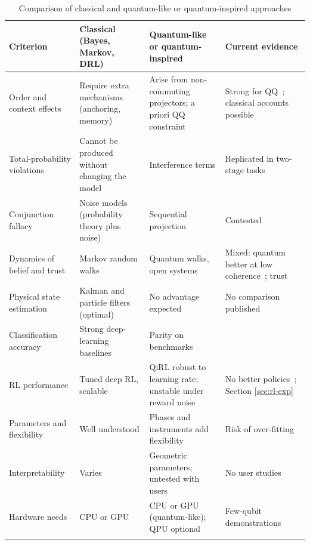\documentclass[pdflatex,sn-basic]{sn-jnl}
\begin{document}
\begin{table}[ht]
\caption{Comparison of classical and quantum-like or quantum-inspired approaches}\label{tab:compare}%
\footnotesize
\begin{tabular}{@{}>{\raggedright\arraybackslash}p{0.200\dimexpr\textwidth-8\tabcolsep\relax}>{\raggedright\arraybackslash}p{0.250\dimexpr\textwidth-8\tabcolsep\relax}>{\raggedright\arraybackslash}p{0.270\dimexpr\textwidth-8\tabcolsep\relax}>{\raggedright\arraybackslash}p{0.280\dimexpr\textwidth-8\tabcolsep\relax}@{}}
\toprule
\textbf{Criterion} & \textbf{Classical (Bayes, Markov, DRL)} & \textbf{Quantum-like or quantum-inspired} & \textbf{Current evidence} \\ \midrule
Order and context effects & Require extra mechanisms (anchoring, memory) & Arise from non-commuting projectors; a priori QQ constraint & Strong for QQ~\citep{Wang2014}; classical accounts possible~\citep{Kellen2018} \\
Total-probability violations & Cannot be produced without changing the model & Interference terms & Replicated in two-stage tasks~\citep{Wang2016,Kvam2015} \\
Conjunction fallacy & Noise models (probability theory plus noise) & Sequential projection & Contested~\citep{BoyerKassem2016,Costello2018} \\
Dynamics of belief and trust & Markov random walks & Quantum walks, open systems & Mixed: quantum better at low coherence~\citep{Busemeyer2019}; trust~\citep{Roeder2023} \\
Physical state estimation & Kalman and particle filters (optimal) & No advantage expected & No comparison published \\
Classification accuracy & Strong deep-learning baselines & Parity on benchmarks & \citep{Li2019,Li2021b} \\
RL performance & Tuned deep RL, scalable & QiRL robust to learning rate; unstable under reward noise & No better policies~\citep{Dong2012}; Section \ref{sec:rl-exp} \\
Parameters and flexibility & Well understood & Phases and instruments add flexibility & Risk of over-fitting~\citep{Broekaert2017} \\
Interpretability & Varies & Geometric parameters; untested with users & No user studies \\
Hardware needs & CPU or GPU & CPU or GPU (quantum-like); QPU optional & Few-qubit demonstrations~\citep{Widdows2023} \\
\botrule
\end{tabular}
\end{table}
\end{document}
